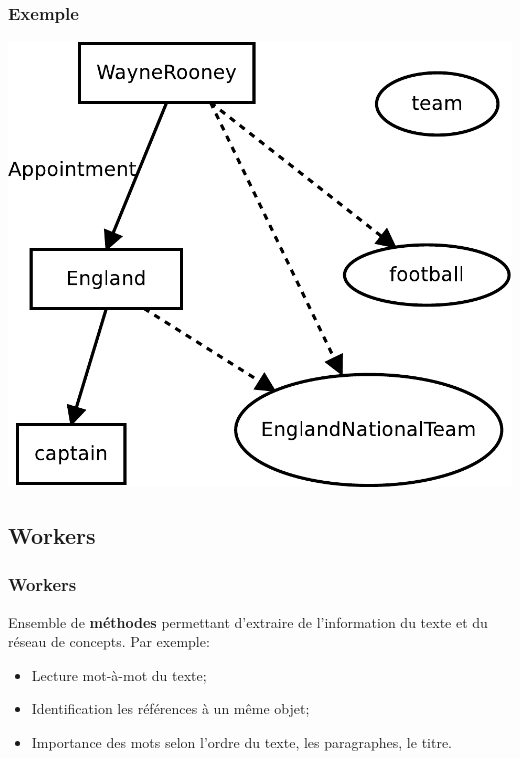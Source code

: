 \documentclass{beamer}
\begin{document}
        \begin{frame}
        \frametitle{Exemple}
            \includegraphics[height=0.8\textheight]{RC/workspace_example.pdf}
        \end{frame}

    \subsection{Workers}
        \begin{frame}
        \frametitle{Workers}
            Ensemble de \textbf{méthodes} permettant d'extraire de l'information du texte et du réseau de concepts.\newline{}
            Par exemple:
            \begin{itemize}
                \item Lecture mot-à-mot du texte;
                \item Identification les références à un même objet;
                \item Importance des mots selon l'ordre du texte, les paragraphes, le titre.
            \end{itemize}
        \end{frame}
\end{document}
